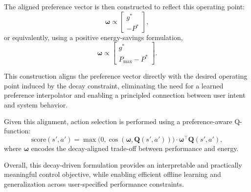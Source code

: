The aligned preference vector is then constructed to reflect this operating point:
\begin{equation}
\boldsymbol{\omega} \propto 
\begin{bmatrix}
g^* \\
- P^*
\end{bmatrix},
\end{equation}
or equivalently, using a positive energy-savings formulation,
\begin{equation}
\boldsymbol{\omega} \propto 
\begin{bmatrix}
g^* \\
P_{\max} - P^*
\end{bmatrix}.
\end{equation}

This construction aligns the preference vector directly with the desired operating point induced by the decay constraint, eliminating the need for a learned preference interpolator and enabling a principled connection between user intent and system behavior.

Given this alignment, action selection is performed using a preference-aware Q-function:
\begin{equation}
\text{score}(s',a') =
\max\!\big(0,\cos(\boldsymbol{\omega},\mathbf{Q}(s',a'))\big)
\cdot
\boldsymbol{\omega}^{\top}\mathbf{Q}(s',a'),
\end{equation}
where $\boldsymbol{\omega}$ encodes the decay-aligned trade-off between performance and energy.

Overall, this decay-driven formulation provides an interpretable and practically meaningful control objective, while enabling efficient offline learning and generalization across user-specified performance constraints.
